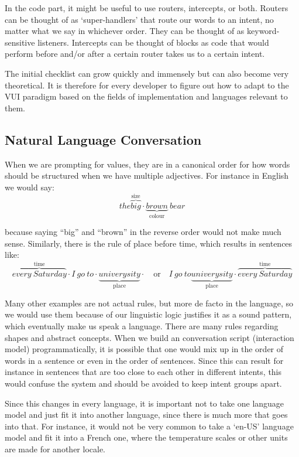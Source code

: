 In the code part, it might be useful to use routers, intercepts, or both.
Routers can be thought of as `super-handlers' that route our words to an intent, no matter what we say in whichever order. They can be thought of as keyword-sensitive listeners. Intercepts can be thought of blocks as code that would perform before and/or after a certain router takes us to a certain intent.

The initial checklist can grow quickly and immensely but can also become very theoretical. It is therefore for every developer to figure out how to adapt to the VUI paradigm based on the fields of implementation and languages relevant to them. %



\subsection*{Natural Language Conversation}
When we are prompting for values, they are in a canonical order for how words should be structured when we have multiple adjectives. For instance in English we would say:
\[
	the 
\overbrace{big}^\text{size} \cdot
\underbrace{brown}_\text{colour}
\ bear 
\]

\noindent because saying ``big'' and ``brown'' in the reverse order would not make much sense. Similarly, there is the rule of place before time, which results in sentences like: 
	\[
	\overbrace{every \ Saturday}^\text{time} \cdot
		I \ go \ to  \cdot
	\underbrace{univerysity}_\text{place} \cdot
	\quad \textrm{or} \quad
	I \ go \ to 
	\underbrace{univerysity}_\text{place} \cdot
	\overbrace{every \ Saturday}^\text{time}
	\]

Many other examples are not actual rules, but more de facto	in the language, so we would use them because of our linguistic logic justifies it as a sound pattern, which eventually make us speak a language. There are many rules regarding shapes and abstract concepts. When we build an conversation script (interaction model) programmatically, it is possible that one would mix up in the order of words in a sentence or even in the order of sentences. Since this can result for instance in sentences that are too close to each other in different intents, this would confuse the system and should be avoided to keep intent groups apart.

Since this changes in every language, it is important not to take one language model and just fit it into another language, since there is much more that goes into that. For instance, it would not be very common to take a `en-US' language model and fit it into a French one, where the temperature scales or other units are made for another locale.


